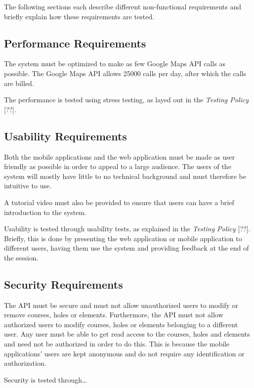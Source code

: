 \documentclass{article}
\begin{document}
    The following sections each describe different non-functional requirements
    and briefly explain how these requirements are tested.

    \subsection{Performance Requirements}

    The system must be optimized to make as few Google Maps API calls as
    possible. The Google Maps API allows 25000 calls per day, after which the
    calls are billed.

    The performance is tested using stress testing, as layed out in the
    \textit{Testing Policy} [??].

    \subsection{Usability Requirements}

    Both the mobile applications and the web application must be made as user
    friendly as possible in order to appeal to a large audience. The users of
    the system will mostly have little to no technical background and must
    therefore be intuitive to use.

    A tutorial video must also be provided to ensure that users can have a brief
    introduction to the system.

    Usability is tested through usability tests, as explained in the
    \textit{Testing Policy} [??]. Briefly, this is done by presenting the web
    application or mobile application to different users, having them use the
    system and providing feedback at the end of the session.

    \subsection{Security Requirements}

    The API must be secure and must not allow unauthorized users to modify or
    remove courses, holes or elements. Furthermore, the API must not allow
    authorized users to modify courses, holes or elements belonging to a
    different user. Any user must be able to get read access to the courses,
    holes and elements and need not be authorized in order to do this. This is
    because the mobile applications' users are kept anonymous and do not
    require any identification or authorization.

    Security is tested through\ldots
\end{document}
